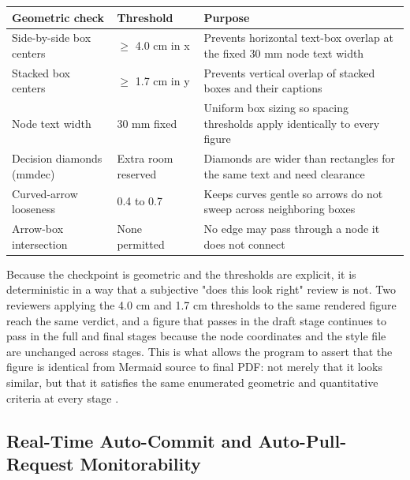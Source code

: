 \noindent\begin{tabularx}{\textwidth}{L{4.6cm} L{3.2cm} Y}
\toprule
\textbf{Geometric check} & \textbf{Threshold} & \textbf{Purpose} \\
\midrule
Side-by-side box centers & $\geq$ 4.0 cm in x & Prevents horizontal text-box overlap at the fixed 30 mm node text width \\
Stacked box centers & $\geq$ 1.7 cm in y & Prevents vertical overlap of stacked boxes and their captions \\
Node text width & 30 mm fixed & Uniform box sizing so spacing thresholds apply identically to every figure \\
Decision diamonds (mmdec) & Extra room reserved & Diamonds are wider than rectangles for the same text and need clearance \\
Curved-arrow looseness & 0.4 to 0.7 & Keeps curves gentle so arrows do not sweep across neighboring boxes \\
Arrow-box intersection & None permitted & No edge may pass through a node it does not connect \\
\bottomrule
\end{tabularx}
\vspace*{-0.35cm}

Because the checkpoint is geometric and the thresholds are explicit, it is
deterministic in a way that a subjective "does this look right" review is not. Two
reviewers applying the 4.0 cm and 1.7 cm thresholds to the same rendered figure
reach the same verdict, and a figure that passes in the draft stage continues to
pass in the full and final stages because the node coordinates and the style file
are unchanged across stages. This is what allows the program to assert that the
figure is identical from Mermaid source to final PDF: not merely that it looks
similar, but that it satisfies the same enumerated geometric and quantitative
criteria at every stage \cite{fdadigtwinpc}.

\subsection{Real-Time Auto-Commit and Auto-Pull-Request Monitorability}

